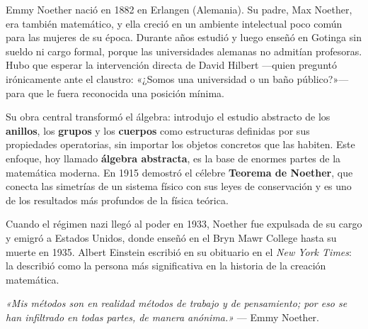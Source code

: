 \documentclass[11pt, letterpaper]{article}
\begin{document}
\begin{tcolorbox}[enhanced,breakable,colback=white,colframe=blockb,colbacktitle=blockb,
  coltitle=white,arc=4pt,leftrule=5pt,left=10pt,right=10pt,top=12pt,bottom=10pt,
  fonttitle=\bfseries,
  attach boxed title to top left={xshift=0.5cm,yshift*=-\tcboxedtitleheight/2},
  boxed title style={colframe=blockb,colback=blockb,arc=2pt},
  title={Emmy Noether \hfill \normalfont\itshape 1882 — 1935}]

\begin{minipage}[t]{0.18\linewidth}
\vspace{0pt}
\end{minipage}
\hfill
\begin{minipage}[t]{0.78\linewidth}
\vspace{0pt}
Emmy Noether nació en 1882 en Erlangen (Alemania). Su padre, Max Noether, era también matemático, y ella creció en un ambiente intelectual poco común para las mujeres de su época. Durante años estudió y luego enseñó en Gotinga sin sueldo ni cargo formal, porque las universidades alemanas no admitían profesoras. Hubo que esperar la intervención directa de David Hilbert —quien preguntó irónicamente ante el claustro: «¿Somos una universidad o un baño público?»— para que le fuera reconocida una posición mínima.

\medskip
Su obra central transformó el álgebra: introdujo el estudio abstracto de los \textbf{anillos}, los \textbf{grupos} y los \textbf{cuerpos} como estructuras definidas por sus propiedades operatorias, sin importar los objetos concretos que las habiten. Este enfoque, hoy llamado \textbf{álgebra abstracta}, es la base de enormes partes de la matemática moderna. En 1915 demostró el célebre \textbf{Teorema de Noether}, que conecta las simetrías de un sistema físico con sus leyes de conservación y es uno de los resultados más profundos de la física teórica.

\medskip
Cuando el régimen nazi llegó al poder en 1933, Noether fue expulsada de su cargo y emigró a Estados Unidos, donde enseñó en el Bryn Mawr College hasta su muerte en 1935. Albert Einstein escribió en su obituario en el \textit{New York Times}: la describió como la persona más significativa en la historia de la creación matemática.

\medskip
\textit{«Mis métodos son en realidad métodos de trabajo y de pensamiento; por eso se han infiltrado en todas partes, de manera anónima.»} — Emmy Noether.
\end{minipage}
\end{tcolorbox}
\end{document}
